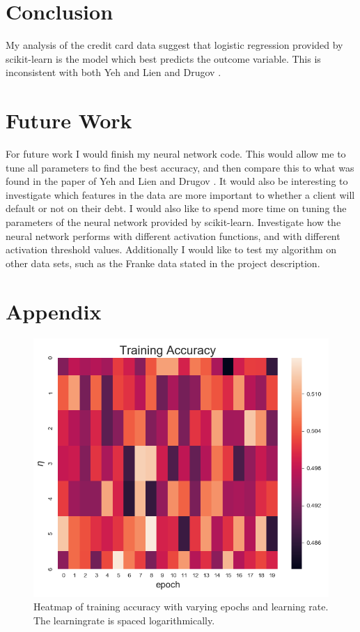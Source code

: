\documentclass[a4paper,11pt,twocolumn]{article}
\begin{document}
\section{Conclusion}
My analysis of the credit card data suggest that logistic regression provided by scikit-learn is the model which best predicts the outcome variable. This is inconsistent with both Yeh and Lien \cite{data} and Drugov \cite{vladimir}.    

\section{Future Work}

For future work I would finish my neural network code. This would allow me to tune all parameters to find the best accuracy, and then compare this to what was found in the paper of Yeh and Lien and Drugov \cite{vladimir}. It would also be interesting to investigate which features in the data are more important to whether a client will default or not on their debt. I would also like to spend more time on tuning the parameters of the neural network provided by scikit-learn.   
Investigate how the neural network performs with different activation functions, and with different activation threshold values. Additionally  I would like to test my algorithm on other data sets, such as the Franke data stated in the project description.    
 
\section{Appendix}

\begin{figure}[h]
\centering
\includegraphics[scale=0.75]{Heatmap1}
\caption{Heatmap of training accuracy with varying epochs and learning rate. The learningrate is spaced logarithmically.}
\label{Heatmap1}
\end{figure}
\end{document}
